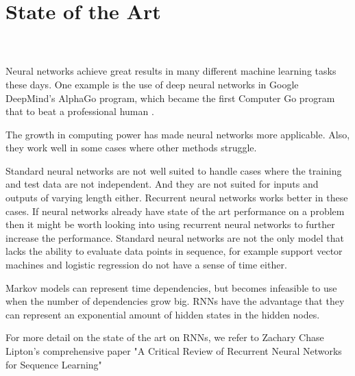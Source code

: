 \chapter{State of the Art}

\\
\\

Neural networks achieve great results in many different machine learning tasks these days. One example is the use of deep neural networks in Google DeepMind's AlphaGo program, which became the first Computer Go program that to beat a professional human \cite{BBC:go-champion}.

The growth in computing power has made neural networks more applicable. Also, they work well in some cases where other methods struggle.

Standard neural networks are not well suited to handle cases where the training and test data are not independent. And they are not suited for inputs and outputs of varying length either. Recurrent neural networks works better in these cases. If neural networks already have state of the art performance on a problem then it might be worth looking into using recurrent neural networks to further increase the performance. Standard neural networks are not the only model that lacks the ability to evaluate data points in sequence, for example support vector machines and logistic regression do not have a sense of time either.

Markov models can represent time dependencies, but becomes infeasible to use when the number of dependencies grow big. RNNs have the advantage that they can represent an exponential amount of hidden states in the hidden nodes.



For more detail on the state of the art on RNNs, we refer to Zachary Chase Lipton's comprehensive paper "A Critical Review of Recurrent Neural Networks
for Sequence Learning" \cite{DBLP:journals/corr/Lipton15}


